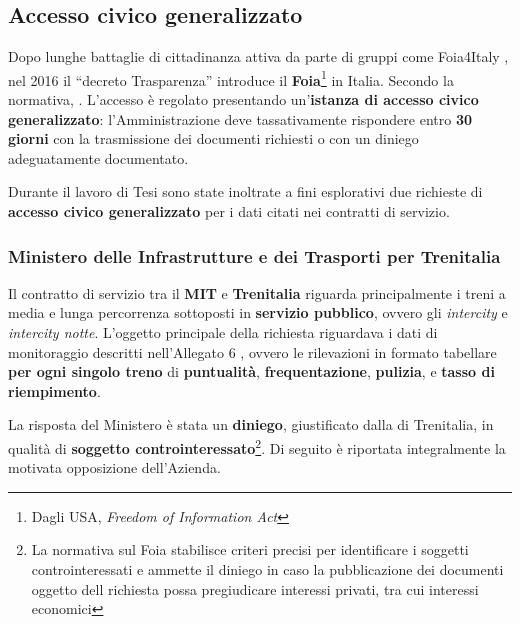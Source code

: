 \documentclass[12pt,italian]{report}
\begin{document}
\subsection{Accesso civico generalizzato}

Dopo lunghe battaglie di cittadinanza attiva da parte di gruppi come
Foia4Italy \cite{SilenziDiStato}, nel 2016 il ``decreto Trasparenza''
\cite{Dlgs97} introduce il \textbf{Foia}\footnote{Dagli USA,
    \textit{Freedom of Information Act}} in Italia.  Secondo la
normativa, .
L'accesso è regolato presentando un'\textbf{istanza di accesso civico
    generalizzato}: l'Amministrazione deve tassativamente rispondere
entro \textbf{30 giorni} con la trasmissione dei documenti richiesti o
con un diniego adeguatamente documentato.

Durante il lavoro di Tesi sono state inoltrate a fini esplorativi due
richieste di \textbf{accesso civico generalizzato} per i dati citati
nei contratti di servizio.

\subsubsection{Ministero delle Infrastrutture e dei Trasporti per
    Trenitalia}

Il contratto di servizio tra il \textbf{MIT} e \textbf{Trenitalia}
riguarda principalmente i treni a media e lunga percorrenza sottoposti
in \textbf{servizio pubblico}, ovvero gli \textit{intercity} e
\textit{intercity notte}.  L'oggetto principale della richiesta
riguardava i dati di monitoraggio descritti nell'Allegato 6
\cite[art.\ 5, comma 1, lettera g]{CdSMIT}, ovvero le rilevazioni in
formato tabellare \textbf{per ogni singolo treno} di
\textbf{puntualità}, \textbf{frequentazione}, \textbf{pulizia}, e
\textbf{tasso di riempimento}.

La risposta del Ministero è stata un \textbf{diniego}, giustificato
dalla  di
Trenitalia, in qualità di \textbf{soggetto
    controinteressato}\footnote{La normativa sul Foia \cite{Dlgs33}
    stabilisce criteri precisi per identificare i soggetti
    controinteressati e ammette il diniego in caso la pubblicazione
    dei documenti oggetto dell richiesta possa pregiudicare interessi
    privati, tra cui interessi economici}.  Di seguito è riportata
integralmente la motivata opposizione dell'Azienda.
\end{document}
